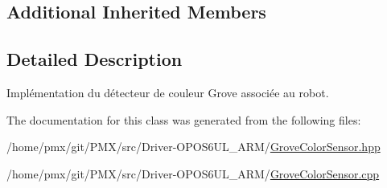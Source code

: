 \subsection*{Additional Inherited Members}


\subsection{Detailed Description}
Implémentation du détecteur de couleur Grove associée au robot. 

The documentation for this class was generated from the following files\+:\begin{DoxyCompactItemize}
\item 
/home/pmx/git/\+P\+M\+X/src/\+Driver-\/\+O\+P\+O\+S6\+U\+L\+\_\+\+A\+R\+M/\hyperlink{GroveColorSensor_8hpp}{Grove\+Color\+Sensor.\+hpp}\item 
/home/pmx/git/\+P\+M\+X/src/\+Driver-\/\+O\+P\+O\+S6\+U\+L\+\_\+\+A\+R\+M/\hyperlink{GroveColorSensor_8cpp}{Grove\+Color\+Sensor.\+cpp}\end{DoxyCompactItemize}

